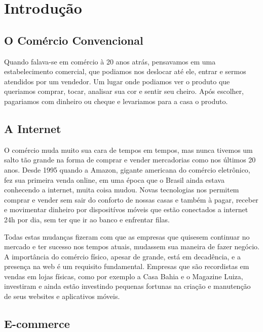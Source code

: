 \chapter{Introdução}

\section{O Comércio Convencional}

Quando falava-se em comércio à 20 anos atrás, pensavamos em uma estabelecimento comercial, que podiamos nos deslocar até ele, entrar e sermos atendidos por um vendedor. Um lugar onde podiamos ver o produto que queriamos comprar, tocar, analisar sua cor e sentir seu cheiro. Após escolher, pagariamos com dinheiro ou cheque e levariamos para a casa o produto.


\section{A Internet}

O comércio muda muito sua cara de tempos em tempos, mas nunca tivemos um salto tão grande na forma de comprar e vender mercadorias como nos últimos 20 anos. Desde 1995 quando a Amazon, gigante americana do comércio eletrônico, fez sua primeira venda online, em uma época que o Brasil ainda estava conhecendo a internet, muita coisa mudou. Novas tecnologias nos permitem comprar e vender sem sair do conforto de nossas casas e também à pagar, receber e movimentar dinheiro por dispositívos móveis que estão conectados a internet 24h por dia, sem ter que ir ao banco e enfrentar filas.

Todas estas mudanças fizeram com que as empresas que quisesem continuar no mercado e ter sucesso nos tempos atuais, mudassem sua maneira de fazer negócio. A importância do comércio físico, apesar de grande, está em decadência, e a presença na web é um requisito fundamental. Empresas que são recordistas em vendas em lojas físicas, como por exemplo a Casa Bahia e o Magazine Luiza, investiram e ainda estão investindo pequenas fortunas na criação e manutenção de seus websites e aplicativos móveis.


\section{E-commerce}

